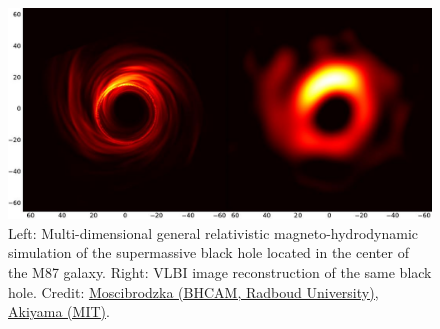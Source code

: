 \documentclass[main.tex]{subfiles}
\begin{document}
    \begin{figure}[t!]
        \centering
        \includegraphics[scale=0.4]{figures/chapter1/m87_bh.jpeg}
        \caption{Left: Multi-dimensional general relativistic magneto-hydrodynamic simulation of the supermassive black hole located in the center of the M87 galaxy. Right: VLBI image reconstruction of the same black hole. Credit: \href{https://blackholecam.org/research/bhshadow/vlbi/}{Moscibrodzka (BHCAM, Radboud University), Akiyama (MIT)}.}
        \label{fig:m87_bh}
    \end{figure}
\end{document}
